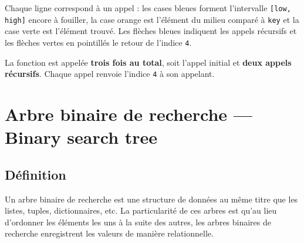 \begin{Exercice}[20 minutes] [Python]
\begin{solution}
\begin{minipage}{\linewidth}
\begin{center}
        \end{center}

        Chaque ligne correspond à un appel : les cases bleues forment
        l'intervalle \texttt{[low, high]} encore à fouiller, la case orange
        est l'élément du milieu comparé à \texttt{key} et la case verte est
        l'élément trouvé. Les flèches bleues indiquent les appels récursifs
        et les flèches vertes en pointillés le retour de l'indice \texttt{4}.

        \medskip

        La fonction est appelée \textbf{trois fois au total}, soit l'appel
        initial et \textbf{deux appels récursifs}. Chaque appel renvoie
        l'indice \texttt{4} à son appelant.
        \end{minipage}
        \end{solution}
    
    \end{Exercice}
    
    \section{Arbre binaire de recherche — Binary search tree}
    \subsection{Définition}
    
    Un arbre binaire de recherche est une structure de données au même titre que les listes, tuples, dictionnaires, etc. La particularité de ces arbres est qu'au lieu d'ordonner les éléments les uns à la suite des autres, les arbres binaires de recherche enregistrent les valeurs de manière relationnelle.\\
    
